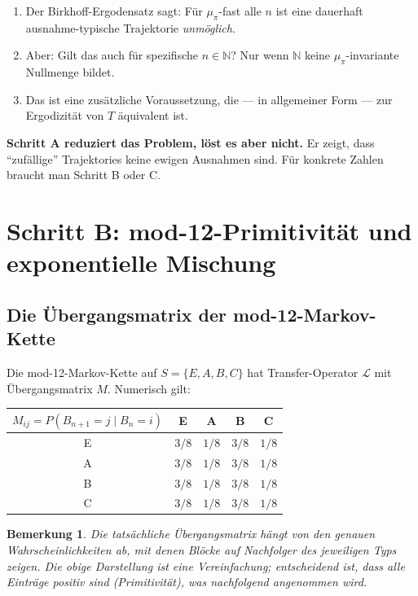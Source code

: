 \documentclass[12pt,a4paper]{article}
\newtheorem{bemerkung}[definition]{Bemerkung}
\newcommand{\N}{\mathbb{N}}
\begin{document}
\begin{tcolorbox}[warnung, title={Grenzen von Schritt A}]
\begin{enumerate}[label=(\arabic*), nosep]
  \item Der Birkhoff-Ergodensatz sagt: Für $\mu_\pi$-fast alle $n$ ist
    eine dauerhaft ausnahme-typische Trajektorie \emph{unmöglich}.
  \item Aber: Gilt das auch für spezifische $n \in \N$? Nur wenn $\N$
    keine $\mu_\pi$-invariante Nullmenge bildet.
  \item Das ist eine zusätzliche Voraussetzung, die --- in allgemeiner
    Form --- zur Ergodizität von $T$ äquivalent ist.
\end{enumerate}
\textbf{Schritt A reduziert das Problem, löst es aber nicht.} Er zeigt,
dass ``zufällige'' Trajektories keine ewigen Ausnahmen sind. Für
konkrete Zahlen braucht man Schritt B oder C.
\end{tcolorbox}

\section{Schritt B: mod-12-Primitivität und exponentielle Mischung}
\label{sec:schrittB}

\subsection{Die Übergangsmatrix der mod-12-Markov-Kette}

Die mod-12-Markov-Kette auf $S = \{E, A, B, C\}$ hat Transfer-Operator
$\mathcal{L}$ mit Übergangsmatrix $M$. Numerisch gilt:

\begin{center}
\renewcommand{\arraystretch}{1.4}
\begin{tabular}{c|cccc}
\toprule
$M_{ij} = P(B_{n+1} = j \mid B_n = i)$ & E & A & B & C \\
\midrule
E & $3/8$ & $1/8$ & $3/8$ & $1/8$ \\
A & $3/8$ & $1/8$ & $3/8$ & $1/8$ \\
B & $3/8$ & $1/8$ & $3/8$ & $1/8$ \\
C & $3/8$ & $1/8$ & $3/8$ & $1/8$ \\
\bottomrule
\end{tabular}
\end{center}

\begin{bemerkung}
Die tatsächliche Übergangsmatrix hängt von den genauen Wahrscheinlichkeiten
ab, mit denen Blöcke auf Nachfolger des jeweiligen Typs zeigen. Die obige
Darstellung ist eine Vereinfachung; entscheidend ist, dass alle Einträge
\emph{positiv} sind (Primitivität), was nachfolgend angenommen wird.
\end{bemerkung}
\end{document}

